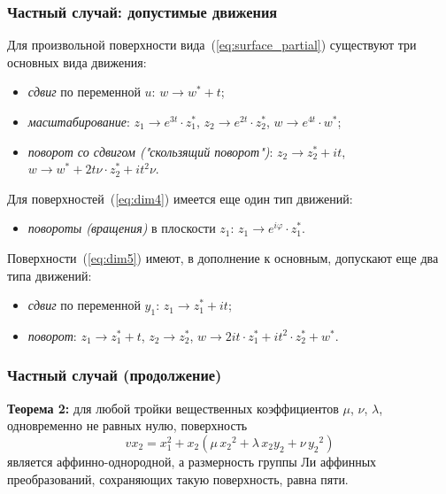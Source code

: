 \documentclass[russian,hyperref={unicode}]{beamer}
\begin{document}
{
	\frametitle{Частный случай: допустимые движения}
	Для произвольной поверхности вида~(\ref{eq:surface_partial}) существуют три основных вида движения:
	\begin{itemize}
		\item \emph{сдвиг} по переменной $u$: $w \to w^{\ast} + t$;
		\item \emph{масштабирование}: $z_1 \to e^{3t} \cdot z_1^{\ast}$, $z_2 \to e^{2t} \cdot z_2^{\ast}$, $w \to e^{4t} \cdot w^{\ast}$;
		\item \emph{поворот со сдвигом ("скользящий поворот")}: $z_2 \to z_2^{\ast} + i t$, $w \to w^{\ast} + 2 t \nu \cdot z_2^{\ast} + i t^2 \nu$.
	\end{itemize} 
	
	Для поверхностей~(\ref{eq:dim4}) имеется еще один тип движений:
	\begin{itemize}
		\item \emph{повороты (вращения)} в плоскости $z_1$: $z_1 \to e^{i \varphi}  \cdot z_1^{\ast}$.
	\end{itemize}
	
	Поверхности~(\ref{eq:dim5}) имеют, в дополнение к основным, допускают еще два типа движений:
	\begin{itemize}
		\item \emph{сдвиг} по переменной $y_1$: $z_1 \to z_1^{\ast} + i t$; 
		\item \emph{поворот}: $z_1 \to z_1^{\ast} + t$, $z_2 \to z_2^{\ast}$, $w \to 2 i t \cdot z_1^{\ast} +  i t^2 \cdot z_2^{\ast} + w^{\ast}$.
	\end{itemize}
}
\frame
{
	\frametitle{Частный случай (продолжение)}
	\textbf{Теорема 2:}
	для любой тройки вещественных коэффициентов $\mu$, $\nu$, $\lambda$, 
	одновременно не равных нулю, поверхность
	\begin{equation*}
		v x_2 = x_1^2 + x_2 (\mu\,{x_2}^2 + \lambda\,x_2 y_2 + \nu\,{y_2}^2)	
	\end{equation*}
	является аффинно-однородной, а размерность группы Ли аффинных преобразований,   
    сохраняющих такую поверхность, равна пяти.
}
\end{document}
